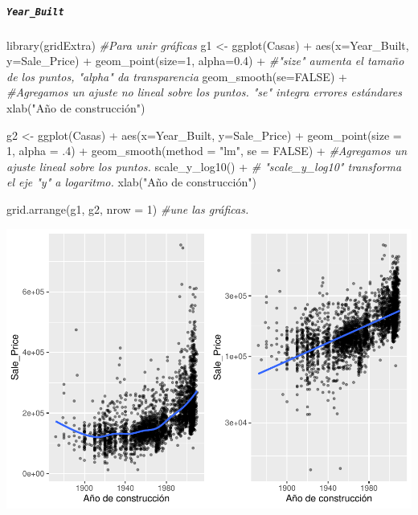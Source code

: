 \documentclass[
]{article}
\newenvironment{Shaded}{\begin{snugshade}}{\end{snugshade}}
\newcommand{\AttributeTok}[1]{\textcolor[rgb]{0.77,0.63,0.00}{#1}}
\newcommand{\CommentTok}[1]{\textcolor[rgb]{0.56,0.35,0.01}{\textit{#1}}}
\newcommand{\ConstantTok}[1]{\textcolor[rgb]{0.00,0.00,0.00}{#1}}
\newcommand{\DecValTok}[1]{\textcolor[rgb]{0.00,0.00,0.81}{#1}}
\newcommand{\FloatTok}[1]{\textcolor[rgb]{0.00,0.00,0.81}{#1}}
\newcommand{\FunctionTok}[1]{\textcolor[rgb]{0.00,0.00,0.00}{#1}}
\newcommand{\NormalTok}[1]{#1}
\newcommand{\OtherTok}[1]{\textcolor[rgb]{0.56,0.35,0.01}{#1}}
\newcommand{\SpecialCharTok}[1]{\textcolor[rgb]{0.00,0.00,0.00}{#1}}
\newcommand{\StringTok}[1]{\textcolor[rgb]{0.31,0.60,0.02}{#1}}
\begin{document}
\hypertarget{year_built}{%
\subparagraph{\texorpdfstring{\texttt{Year\_Built}}{Year\_Built}}\label{year_built}}

\begin{Shaded}
\begin{Highlighting}[]
\FunctionTok{library}\NormalTok{(gridExtra) }\CommentTok{\#Para unir gráficas}
\NormalTok{g1 }\OtherTok{\textless{}{-}} \FunctionTok{ggplot}\NormalTok{(Casas) }\SpecialCharTok{+}
  \FunctionTok{aes}\NormalTok{(}\AttributeTok{x=}\NormalTok{Year\_Built, }\AttributeTok{y=}\NormalTok{Sale\_Price) }\SpecialCharTok{+}
  \FunctionTok{geom\_point}\NormalTok{(}\AttributeTok{size=}\DecValTok{1}\NormalTok{, }\AttributeTok{alpha=}\FloatTok{0.4}\NormalTok{) }\SpecialCharTok{+} \CommentTok{\#"size" aumenta el tamaño de los puntos, "alpha" da transparencia}
  \FunctionTok{geom\_smooth}\NormalTok{(}\AttributeTok{se=}\ConstantTok{FALSE}\NormalTok{) }\SpecialCharTok{+} \CommentTok{\#Agregamos un ajuste no lineal sobre los puntos. "se" integra errores estándares}
  \FunctionTok{xlab}\NormalTok{(}\StringTok{"Año de construcción"}\NormalTok{)}


\NormalTok{g2 }\OtherTok{\textless{}{-}} \FunctionTok{ggplot}\NormalTok{(Casas) }\SpecialCharTok{+}
  \FunctionTok{aes}\NormalTok{(}\AttributeTok{x=}\NormalTok{Year\_Built, }\AttributeTok{y=}\NormalTok{Sale\_Price) }\SpecialCharTok{+}
  \FunctionTok{geom\_point}\NormalTok{(}\AttributeTok{size =} \DecValTok{1}\NormalTok{, }\AttributeTok{alpha =}\NormalTok{ .}\DecValTok{4}\NormalTok{) }\SpecialCharTok{+} 
  \FunctionTok{geom\_smooth}\NormalTok{(}\AttributeTok{method =} \StringTok{"lm"}\NormalTok{, }\AttributeTok{se =} \ConstantTok{FALSE}\NormalTok{) }\SpecialCharTok{+} \CommentTok{\#Agregamos un ajuste lineal sobre los puntos.}
  \FunctionTok{scale\_y\_log10}\NormalTok{() }\SpecialCharTok{+} \CommentTok{\# "scale\_y\_log10" transforma el eje "y" a logaritmo.}
  \FunctionTok{xlab}\NormalTok{(}\StringTok{"Año de construcción"}\NormalTok{) }

\FunctionTok{grid.arrange}\NormalTok{(g1, g2, }\AttributeTok{nrow =} \DecValTok{1}\NormalTok{) }\CommentTok{\#une las  gráficas. }
\end{Highlighting}
\end{Shaded}

\includegraphics{LAB02_files/figure-latex/Gráfico de dispersión-1.pdf}
\end{document}

